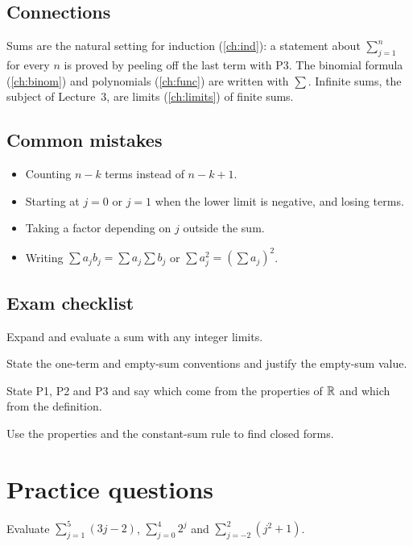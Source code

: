 \subsection*{Connections}
Sums are the natural setting for induction (\cref{ch:ind}): a statement about $\sum_{j=1}^{n}$ for every $n$ is proved
by peeling off the last term with P3. The binomial formula (\cref{ch:binom}) and polynomials (\cref{ch:func}) are
written with $\sum$. Infinite sums, the subject of Lecture~3, are limits (\cref{ch:limits}) of finite sums.

\subsection*{Common mistakes}
\begin{itemize}
  \item Counting $n-k$ terms instead of $n-k+1$.
  \item Starting at $j=0$ or $j=1$ when the lower limit is negative, and losing terms.
  \item Taking a factor depending on $j$ outside the sum.
  \item Writing $\sum a_jb_j=\sum a_j\sum b_j$ or $\sum a_j^2=(\sum a_j)^2$.
\end{itemize}

\subsection*{Exam checklist}
\begin{checklist}
  \item Expand and evaluate a sum with any integer limits.
  \item State the one-term and empty-sum conventions and justify the empty-sum value.
  \item State P1, P2 and P3 and say which come from the properties of $\mathbb{R}$ and which from the definition.
  \item Use the properties and the constant-sum rule to find closed forms.
\end{checklist}

\section{Practice questions}
\pq[basic] Evaluate $\sum_{j=1}^{5}(3j-2)$, $\sum_{j=0}^{4}2^j$ and $\sum_{j=-2}^{2}(j^2+1)$.


